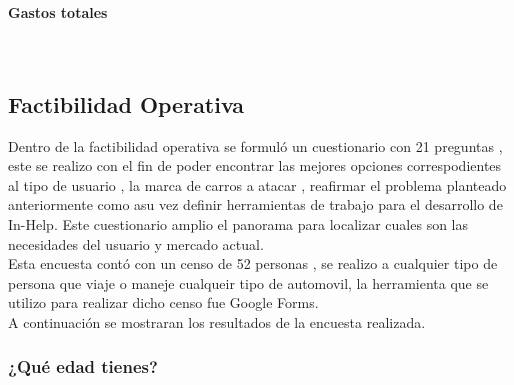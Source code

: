 \paragraph{Gastos totales} \textcolor{White}{.} \newline
%
%  
\subsection{Factibilidad Operativa}

Dentro de la factibilidad operativa se formuló un cuestionario con 21 preguntas , este se realizo con el fin de poder encontrar las mejores opciones correspodientes al tipo de usuario , la marca de carros a atacar , reafirmar el problema planteado anteriormente como asu vez definir herramientas de trabajo para el desarrollo de In-Help. Este cuestionario amplio el panorama para localizar cuales son las necesidades del usuario y mercado actual. \\
Esta encuesta contó con un censo de 52 personas , se realizo a cualquier tipo de persona que viaje o maneje cualqueir tipo de automovil, la herramienta que se utilizo para realizar dicho censo fue Google Forms. \\
A continuación se mostraran los resultados de la encuesta realizada.
\subsubsection{¿Qué edad tienes?}


